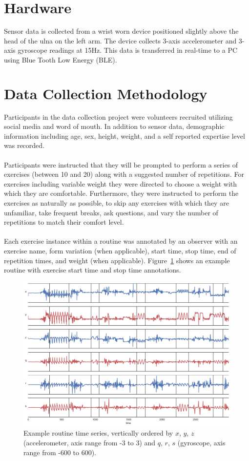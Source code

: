 \documentclass[12pt]{report}
\newcommand{\1}[0]{\mathbbm{1}}
\begin{document}
\section{Hardware}
Sensor data is collected from a wrist worn device positioned slightly
above the head of the ulna on the left arm.
The device collects 3-axis accelerometer and 3-axis gyroscope readings at 15Hz.
This data is transferred in real-time to a PC using Blue Tooth Low Energy (BLE).

\section{Data Collection Methodology}
Participants in the data collection project were volunteers recruited utilizing social media
and word of mouth. In addition to sensor data, demographic information including age, sex, height, weight,
and a self reported expertise level was recorded.
\\\\
Participants were instructed that they will be prompted to perform a series of exercises (between 10 and 20)
along with a suggested number of repetitions. For exercises including variable weight they were directed
to choose a weight with which they are comfortable. Furthermore, they were instructed to perform the exercises
as naturally as possible, to skip any exercises with which they are unfamiliar, take frequent breaks,
ask questions, and vary the number of repetitions to match their comfort level.
\\\\
Each exercise instance within a routine was annotated by an observer with an exercise name,
form variation (when applicable), start time, stop time, end of repetition times, and weight (when applicable).
Figure~\ref{fig:routine} shows an example routine with exercise start time and stop time annotations.

\begin{figure}[ht!]
    \centering
    \includegraphics[width=1\textwidth]{img/routine_380.pdf}
    \caption[Example routine time series]{Example routine time series,
    vertically ordered by $x$, $y$, $z$ (accelerometer, axis range from -3 to 3)
    and $q$, $r$, $s$ (gyroscope, axis range from -600 to 600).}
    \label{fig:routine}
\end{figure}
\end{document}
